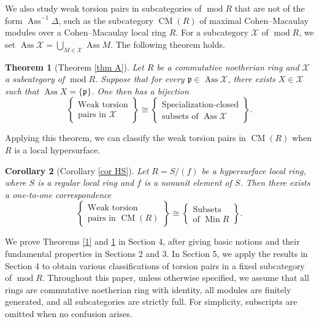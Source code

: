 \documentclass{amsart}
\newtheorem{thm}{Theorem}[section]
\newtheorem{cor}[thm]{Corollary}
\theoremstyle{definition}
\theoremstyle{remark}
\def\Ass{\operatorname{Ass}}
\def\CM{\operatorname{CM}}
\def\Min{\operatorname{Min}}
\def\mod{\operatorname{mod}}
\def\p{\mathfrak{p}}
\def\X{\mathcal{X}}
\begin{document}
We also study weak torsion pairs in subcategories of $\mod R$ that are not of the form $\Ass^{-1}\Delta$, such as the subcategory $\CM(R)$ of maximal Cohen--Macaulay modules over a Cohen--Macaulay local ring $R$.
For a subcategory $\X$ of $\mod R$, we set $\Ass\X=\bigcup_{M\in\X}\Ass M$.
The following theorem holds.

\begin{thm}[Theorem \ref{thm A}]\label{3}
Let $R$ be a commutative noetherian ring and $\X$ a subcategory of $\mod R$. Suppose that for every $\p\in\Ass\X$, there exists $X\in\X$ such that $\Ass X=\{\p\}$.
One then has a bijection
$$
\left\{\begin{matrix}\text{Weak torsion}\\
\text{pairs in $\X$}\end{matrix}\right\}
\cong
\left\{\begin{matrix}\text{Specialization-closed}\\
\text{subsets of $\Ass\X$}\end{matrix}\right\}.
$$
\end{thm}

Applying this theorem, we can classify the weak torsion pairs in $\CM(R)$ when $R$ is a local hypersurface.

\begin{cor}[Corollary \ref{cor HS}]
Let $R=S/(f)$ be a hypersurface local ring, where $S$ is a regular local ring and $f$ is a nonunit element of $S$. Then there exists a one-to-one correspondence
$$
\left\{\begin{matrix}\text{Weak torsion}\\
\text{pairs in $\CM(R)$}\end{matrix}\right\}
\cong
\left\{\begin{matrix}\text{Subsets}\\
\text{of $\Min R$}\end{matrix}\right\}.
$$
\end{cor}

We prove Theorems \ref{1} and \ref{3} in Section 4, after giving basic notions and their fundamental properties in Sections 2 and 3. In Section 5, we apply the results in Section 4 to obtain various classifications of torsion pairs in a fixed subcategory of $\mod R$.
Throughout this paper, unless otherwise specified, we assume that all rings are commutative noetherian ring with identity, all modules are finitely generated, and all subcategories are strictly full. For simplicity, subscripts are omitted when no confusion arises.
\end{document}
